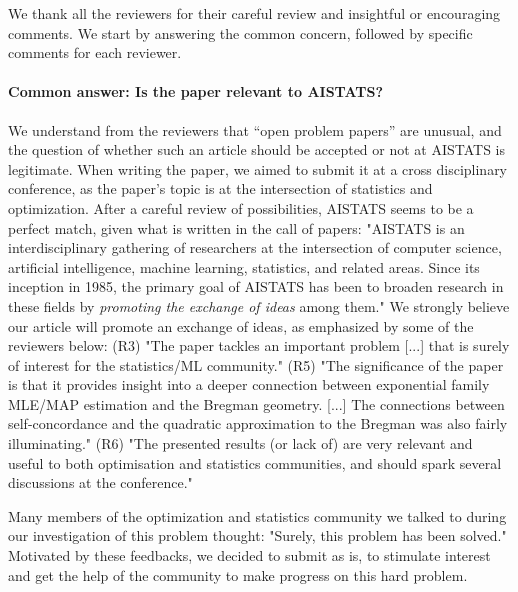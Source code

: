 
\fi


We thank all the reviewers for their careful review and insightful or encouraging comments. We start by answering the common concern, followed by specific comments for each reviewer.
	
\paragraph{Common answer: Is the paper relevant to AISTATS?}
We understand from the reviewers that “open problem papers”  are unusual, and the question of whether such an article should be accepted or not at AISTATS is legitimate. 
When writing the paper, we aimed to submit it at a cross disciplinary conference, as the paper’s topic is at the intersection of statistics and optimization. After a careful review of possibilities, AISTATS seems to be a perfect match, given what is written in the call of papers:
"AISTATS is an interdisciplinary gathering of researchers at the intersection of computer science, artificial intelligence, machine learning, statistics, and related areas. Since its inception in 1985, the primary goal of AISTATS has been to broaden research in these fields by \emph{promoting the exchange of ideas} among them."  
We strongly believe our article will promote an exchange of ideas, as emphasized by some of the reviewers below:
(R3) "The paper tackles an important problem [...] that is surely of interest for the statistics/ML community."
(R5)  "The significance of the paper is that it provides insight into a deeper connection between exponential family MLE/MAP estimation and the Bregman geometry. [...]  The connections between self-concordance and the quadratic approximation to the Bregman was also fairly illuminating."
(R6) "The presented results (or lack of) are very relevant and useful to both optimisation and statistics communities, and should spark several discussions at the conference."

Many members of the optimization and statistics community we talked to during our investigation of this problem thought: "Surely, this problem has been solved."
Motivated by these feedbacks, we decided to submit as is, 
to stimulate interest and get the help of the community to make progress on this hard problem.


